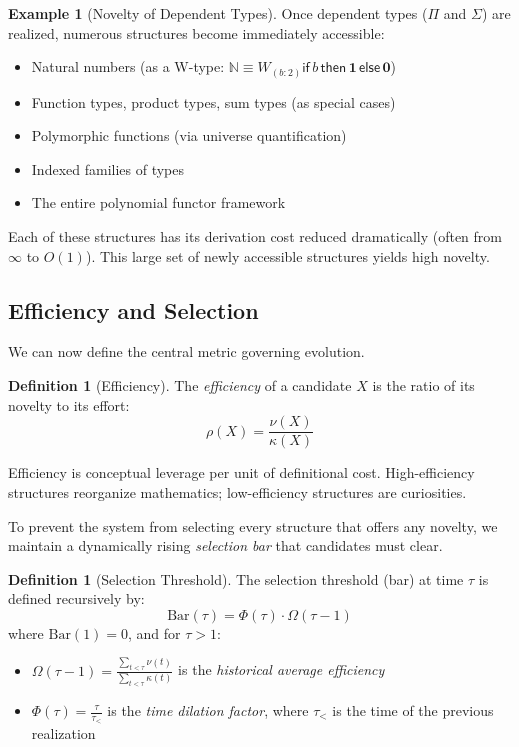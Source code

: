 \documentclass[11pt]{article}
\theoremstyle{definition}
\newtheorem{definition}[theorem]{Definition}
\newtheorem{example}[theorem]{Example}
\theoremstyle{remark}
\newcommand{\N}{\mathbb{N}}
\begin{document}
\begin{example}[Novelty of Dependent Types]
Once dependent types ($\Pi$ and $\Sigma$) are realized, numerous structures become immediately accessible:
\begin{itemize}
\item Natural numbers (as a W-type: $\N \equiv W_{(b:2)} \mathsf{if}\, b\, \mathsf{then}\, \mathbf{1}\, \mathsf{else}\, \mathbf{0}$)
\item Function types, product types, sum types (as special cases)
\item Polymorphic functions (via universe quantification)
\item Indexed families of types
\item The entire polynomial functor framework
\end{itemize}
Each of these structures has its derivation cost reduced dramatically (often from $\infty$ to $O(1)$). This large set of newly accessible structures yields high novelty.
\end{example}

\subsection{Efficiency and Selection}

We can now define the central metric governing evolution.

\begin{definition}[Efficiency]
\label{def:efficiency}
The \emph{efficiency} of a candidate $X$ is the ratio of its novelty to its effort:
\[
\rho(X) = \frac{\nu(X)}{\kappa(X)}
\]
\end{definition}

Efficiency is conceptual leverage per unit of definitional cost. High-efficiency structures reorganize mathematics; low-efficiency structures are curiosities.

To prevent the system from selecting every structure that offers any novelty, we maintain a dynamically rising \emph{selection bar} that candidates must clear.

\begin{definition}[Selection Threshold]
\label{def:selection-bar}
The selection threshold (bar) at time $\tau$ is defined recursively by:
\[
\mathrm{Bar}(\tau) = \Phi(\tau) \cdot \Omega(\tau - 1)
\]
where $\mathrm{Bar}(1) = 0$, and for $\tau > 1$:
\begin{itemize}
\item $\Omega(\tau - 1) = \frac{\sum_{t < \tau} \nu(t)}{\sum_{t < \tau} \kappa(t)}$ is the \emph{historical average efficiency}
\item $\Phi(\tau) = \frac{\tau}{\tau_<}$ is the \emph{time dilation factor}, where $\tau_<$ is the time of the previous realization
\end{itemize}
\end{definition}
\end{document}
